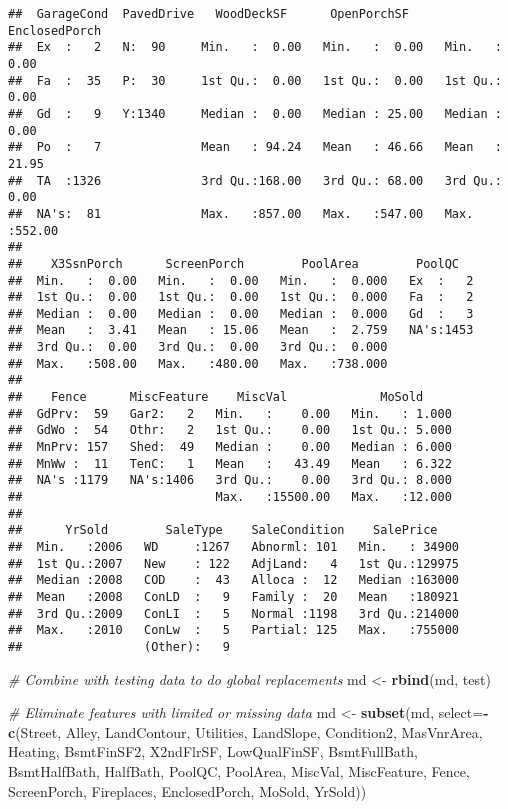 \documentclass[]{article}
\newenvironment{Shaded}{\begin{snugshade}}{\end{snugshade}}
\newcommand{\CommentTok}[1]{\textcolor[rgb]{0.56,0.35,0.01}{\textit{#1}}}
\newcommand{\DataTypeTok}[1]{\textcolor[rgb]{0.13,0.29,0.53}{#1}}
\newcommand{\KeywordTok}[1]{\textcolor[rgb]{0.13,0.29,0.53}{\textbf{#1}}}
\newcommand{\NormalTok}[1]{#1}
\newcommand{\OperatorTok}[1]{\textcolor[rgb]{0.81,0.36,0.00}{\textbf{#1}}}
\newcommand{\StringTok}[1]{\textcolor[rgb]{0.31,0.60,0.02}{#1}}
\begin{document}
\begin{verbatim}
##  GarageCond  PavedDrive   WoodDeckSF      OpenPorchSF     EnclosedPorch   
##  Ex  :   2   N:  90     Min.   :  0.00   Min.   :  0.00   Min.   :  0.00  
##  Fa  :  35   P:  30     1st Qu.:  0.00   1st Qu.:  0.00   1st Qu.:  0.00  
##  Gd  :   9   Y:1340     Median :  0.00   Median : 25.00   Median :  0.00  
##  Po  :   7              Mean   : 94.24   Mean   : 46.66   Mean   : 21.95  
##  TA  :1326              3rd Qu.:168.00   3rd Qu.: 68.00   3rd Qu.:  0.00  
##  NA's:  81              Max.   :857.00   Max.   :547.00   Max.   :552.00  
##                                                                           
##    X3SsnPorch      ScreenPorch        PoolArea        PoolQC    
##  Min.   :  0.00   Min.   :  0.00   Min.   :  0.000   Ex  :   2  
##  1st Qu.:  0.00   1st Qu.:  0.00   1st Qu.:  0.000   Fa  :   2  
##  Median :  0.00   Median :  0.00   Median :  0.000   Gd  :   3  
##  Mean   :  3.41   Mean   : 15.06   Mean   :  2.759   NA's:1453  
##  3rd Qu.:  0.00   3rd Qu.:  0.00   3rd Qu.:  0.000              
##  Max.   :508.00   Max.   :480.00   Max.   :738.000              
##                                                                 
##    Fence      MiscFeature    MiscVal             MoSold      
##  GdPrv:  59   Gar2:   2   Min.   :    0.00   Min.   : 1.000  
##  GdWo :  54   Othr:   2   1st Qu.:    0.00   1st Qu.: 5.000  
##  MnPrv: 157   Shed:  49   Median :    0.00   Median : 6.000  
##  MnWw :  11   TenC:   1   Mean   :   43.49   Mean   : 6.322  
##  NA's :1179   NA's:1406   3rd Qu.:    0.00   3rd Qu.: 8.000  
##                           Max.   :15500.00   Max.   :12.000  
##                                                              
##      YrSold        SaleType    SaleCondition    SalePrice     
##  Min.   :2006   WD     :1267   Abnorml: 101   Min.   : 34900  
##  1st Qu.:2007   New    : 122   AdjLand:   4   1st Qu.:129975  
##  Median :2008   COD    :  43   Alloca :  12   Median :163000  
##  Mean   :2008   ConLD  :   9   Family :  20   Mean   :180921  
##  3rd Qu.:2009   ConLI  :   5   Normal :1198   3rd Qu.:214000  
##  Max.   :2010   ConLw  :   5   Partial: 125   Max.   :755000  
##                 (Other):   9
\end{verbatim}

\begin{Shaded}
\begin{Highlighting}[]
\CommentTok{# Combine with testing data to do global replacements}
\NormalTok{md <-}\StringTok{ }\KeywordTok{rbind}\NormalTok{(md, test)}

\CommentTok{# Eliminate features with limited or missing data}
\NormalTok{md <-}\StringTok{ }\KeywordTok{subset}\NormalTok{(md, }\DataTypeTok{select=}\OperatorTok{-}\KeywordTok{c}\NormalTok{(Street, Alley, LandContour, Utilities, }
\NormalTok{                           LandSlope, Condition2, MasVnrArea, Heating, }
\NormalTok{                           BsmtFinSF2, X2ndFlrSF, LowQualFinSF, BsmtFullBath, }
\NormalTok{                           BsmtHalfBath, HalfBath, PoolQC, PoolArea, MiscVal, }
\NormalTok{                           MiscFeature, Fence, ScreenPorch, Fireplaces,}
\NormalTok{                           EnclosedPorch, MoSold, YrSold))}
\end{Highlighting}
\end{Shaded}
\end{document}
